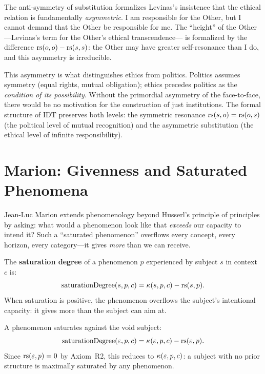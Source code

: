\begin{interpretation}
\label{interp:ethical-asymmetry}
The anti-symmetry of substitution formalizes Levinas's insistence that the
ethical relation is fundamentally \emph{asymmetric}.  I am responsible for the
Other, but I cannot demand that the Other be responsible for me.  The
``height'' of the Other---Levinas's term for the Other's ethical transcendence---
is formalized by the difference $\mathrm{rs}(o, o) - \mathrm{rs}(s, s)$: the Other may have
greater self-resonance than I do, and this asymmetry is irreducible.

This asymmetry is what distinguishes ethics from politics.  Politics assumes
symmetry (equal rights, mutual obligation); ethics precedes politics as the
\emph{condition of its possibility}.  Without the primordial asymmetry of the
face-to-face, there would be no motivation for the construction of just
institutions.  The formal structure of IDT preserves both levels: the symmetric
resonance $\mathrm{rs}(s, o) = \mathrm{rs}(o, s)$ (the political level of mutual recognition)
and the asymmetric substitution (the ethical level of infinite responsibility).
\end{interpretation}

\section{Marion: Givenness and Saturated Phenomena}

Jean-Luc Marion extends phenomenology beyond Husserl's principle of principles
by asking: what would a phenomenon look like that \emph{exceeds} our capacity
to intend it?  Such a ``saturated phenomenon'' overflows every concept,
every horizon, every category---it gives \emph{more} than we can receive.

\begin{definition}
\label{def:saturation-degree}
The \textbf{saturation degree} of a phenomenon $p$ experienced by subject $s$
in context $c$ is:
\[
\mathrm{saturationDegree}(s, p, c) = \kappa(s, p, c) - \mathrm{rs}(s, p).
\]
When saturation is positive, the phenomenon overflows the subject's intentional
capacity: it gives more than the subject can aim at.
\end{definition}

\begin{theorem}
\label{thm:saturation-void}
A phenomenon saturates against the void subject:
\[
\mathrm{saturationDegree}(\varepsilon, p, c) = \kappa(\varepsilon, p, c) - \mathrm{rs}(\varepsilon, p).
\]
Since $\mathrm{rs}(\varepsilon, p) = 0$ by Axiom~R2, this reduces to $\kappa(\varepsilon, p, c)$:
a subject with no prior structure is maximally saturated by any phenomenon.
\end{theorem}

